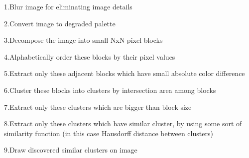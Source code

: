 1.Blur image for eliminating image details

2.Convert image to degraded palette

3.Decompose the image into small NxN pixel blocks

4.Alphabetically order these blocks by their pixel values

5.Extract only these adjacent blocks which have small absolute color
difference

6.Cluster these blocks into clusters by intersection area among blocks

7.Extract only these clusters which are bigger than block size

8.Extract only these clusters which have similar cluster, by using some sort of similarity function (in this case Hausdorff distance between clusters)

9.Draw discovered similar clusters on image



